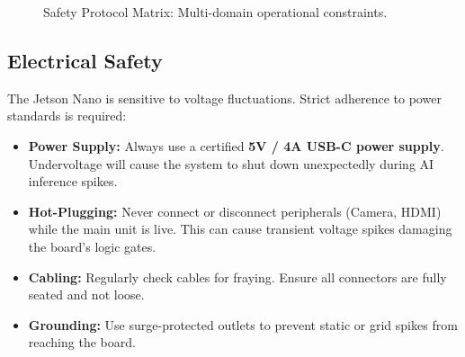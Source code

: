 \begin{figure}[htbp]
	\caption{Safety Protocol Matrix: Multi-domain operational constraints.}
	\label{fig:safety_matrix}
\end{figure}

\vspace{0.5cm}

\subsection{Electrical Safety}
The Jetson Nano is sensitive to voltage fluctuations. Strict adherence to power standards is required:
\begin{itemize}
	\item \textbf{Power Supply:} Always use a certified \textbf{5V / 4A USB-C power supply}. Undervoltage will cause the system to shut down unexpectedly during AI inference spikes.
	\item \textbf{Hot-Plugging:} Never connect or disconnect peripherals (Camera, HDMI) while the main unit is live. This can cause transient voltage spikes damaging the board's logic gates.
	\item \textbf{Cabling:} Regularly check cables for fraying. Ensure all connectors are fully seated and not loose.
	\item \textbf{Grounding:} Use surge-protected outlets to prevent static or grid spikes from reaching the board.
\end{itemize}

